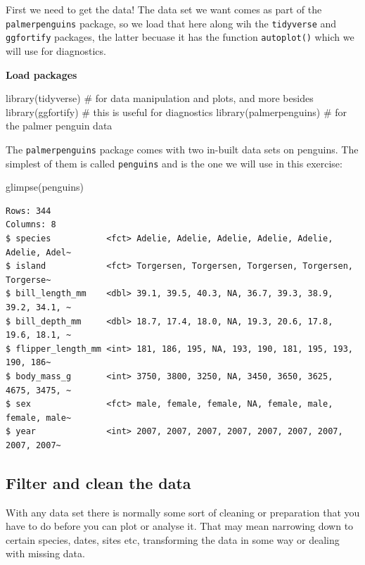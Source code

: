 \documentclass[
  letterpaper,
  DIV=11,
  numbers=noendperiod]{scrreprt}
\newenvironment{Shaded}{\begin{snugshade}}{\end{snugshade}}
\newcommand{\CommentTok}[1]{\textcolor[rgb]{0.37,0.37,0.37}{#1}}
\newcommand{\FunctionTok}[1]{\textcolor[rgb]{0.28,0.35,0.67}{#1}}
\newcommand{\NormalTok}[1]{\textcolor[rgb]{0.00,0.23,0.31}{#1}}
\begin{document}
First we need to get the data! The data set we want comes as part of the
\texttt{palmerpenguins} package, so we load that here along wih the
\texttt{tidyverse} and \texttt{ggfortify} packages, the latter becuase
it has the function \texttt{autoplot()} which we will use for
diagnostics.

\textbf{Load packages}

\begin{Shaded}
\begin{Highlighting}[]
\FunctionTok{library}\NormalTok{(tidyverse) }\CommentTok{\# for data manipulation and plots, and more besides}
\FunctionTok{library}\NormalTok{(ggfortify) }\CommentTok{\# this is useful for diagnostics}
\FunctionTok{library}\NormalTok{(palmerpenguins) }\CommentTok{\# for the palmer penguin data}
\end{Highlighting}
\end{Shaded}

The \texttt{palmerpenguins} package comes with two in-built data sets on
penguins. The simplest of them is called \texttt{penguins} and is the
one we will use in this exercise:

\begin{Shaded}
\begin{Highlighting}[]
\FunctionTok{glimpse}\NormalTok{(penguins)}
\end{Highlighting}
\end{Shaded}

\begin{verbatim}
Rows: 344
Columns: 8
$ species           <fct> Adelie, Adelie, Adelie, Adelie, Adelie, Adelie, Adel~
$ island            <fct> Torgersen, Torgersen, Torgersen, Torgersen, Torgerse~
$ bill_length_mm    <dbl> 39.1, 39.5, 40.3, NA, 36.7, 39.3, 38.9, 39.2, 34.1, ~
$ bill_depth_mm     <dbl> 18.7, 17.4, 18.0, NA, 19.3, 20.6, 17.8, 19.6, 18.1, ~
$ flipper_length_mm <int> 181, 186, 195, NA, 193, 190, 181, 195, 193, 190, 186~
$ body_mass_g       <int> 3750, 3800, 3250, NA, 3450, 3650, 3625, 4675, 3475, ~
$ sex               <fct> male, female, female, NA, female, male, female, male~
$ year              <int> 2007, 2007, 2007, 2007, 2007, 2007, 2007, 2007, 2007~
\end{verbatim}

\subsection{Filter and clean the data}\label{filter-and-clean-the-data}

With any data set there is normally some sort of cleaning or preparation
that you have to do before you can plot or analyse it. That may mean
narrowing down to certain species, dates, sites etc, transforming the
data in some way or dealing with missing data.
\end{document}
